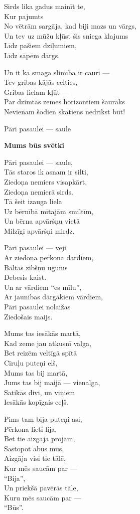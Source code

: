 \documentclass[14pt]{extarticle}
\begin{document}
{{Sirds lika gadus mainīt te,\\
Kur pajumts\\
No vētrām sargāja, kad biji mazs un vārgs,\\
Un tev uz mūžu kļūst šis sniega klajums\\
Līdz pašiem dziļumiem,\\
Līdz sāpēm dārgs. 

Un it kā smaga slimība ir cauri ---\\
Tev gribas kājās celties,\\
Gribas lielam kļūt ---\\
Par dzimtās zemes horizontiem šaurāks\\
Nevienam šodien skatiens nedrīkst būt!


\newpage 

{\large \sc Pāri pasaulei --- saule}

{\bf Mums būs svētki}

Pāri pasaulei --- saule,\\
Tās staros ik asnam ir silti,\\
Ziedoņa nemiers visapkārt,\\
Ziedoņa nemierā sirds.\\
Tā šeit izauga liela\\
Uz bērnībā mītajām smiltīm,\\
Un bērna apvāršņu vietā\\
Milzīgi apvāršņi mirdz. 

Pāri pasaulei --- vēji\\
Ar ziedoņa pērkona dārdiem,\\
Baltās zibšņu ugunīs\\
Debesis kaist.\\
Un ar vārdiem ``es mīlu'',\\
Ar jaunības dārgākiem vārdiem,\\
Pāri pasaulei nolaižas\\
Ziedošais maijs. 

Mums tas iesākās martā,\\
Kad zeme jau atkusnī valga,\\
Bet reizēm veltīgā spītā\\
Cīruļu puteņi elš,\\
Mums tas bij martā,\\
Jums tas bij maijā --- vienalga,\\
Satikās divi, un viņiem\\
Iesākās kopīgais ceļš. 

Pims tam bija puteņi asi,\\
Pērkona lieti lija,\\
Bet tie aizgāja projām,\\
Sastopot abus mūs,\\
Aizgāja visi tie tālē,\\
Kur mēs saucām par ---\\
``Bija'',\\
Un priekšā pavērās tāle,\\
Kuru mēs saucām par ---\\
``Būs''.

}}
\end{document}
